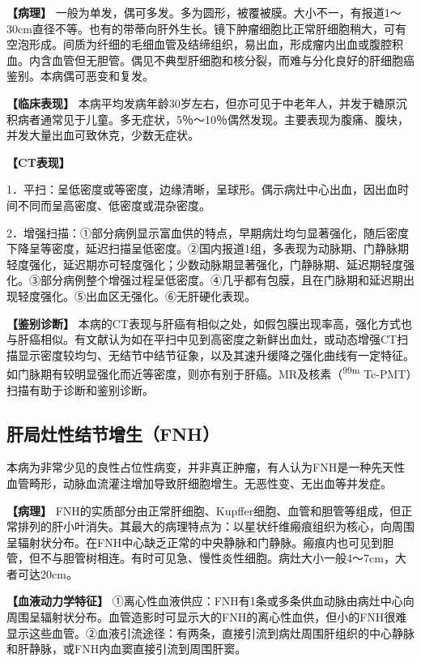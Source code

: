 \textbf{【病理】}
一般为单发，偶可多发。多为圆形，被覆被膜。大小不一，有报道1～30cm直径不等。也有的带蒂向肝外生长。镜下肿瘤细胞比正常肝细胞稍大，可有空泡形成。间质为纤细的毛细血管及结缔组织，易出血，形成瘤内出血或腹腔积血。内含血管但无胆管。偶见不典型肝细胞和核分裂，而难与分化良好的肝细胞癌鉴别。本病偶可恶变和复发。

\textbf{【临床表现】}
本病平均发病年龄30岁左右，但亦可见于中老年人，并发于糖原沉积病者通常见于儿童。多无症状，5％～10％偶然发现。主要表现为腹痛、腹块，并发大量出血可致休克，少数无症状。

\textbf{【CT表现】}

1．平扫：呈低密度或等密度，边缘清晰，呈球形。偶示病灶中心出血，因出血时间不同而呈高密度、低密度或混杂密度。

2．增强扫描：①部分病例显示富血供的特点，早期病灶均匀显著强化，随后密度下降呈等密度，延迟扫描呈低密度。②国内报道1组，多表现为动脉期、门静脉期轻度强化，延迟期亦可轻度强化；少数动脉期显著强化，门静脉期、延迟期轻度强化。③部分病例整个增强过程呈低密度。④几乎都有包膜，且在门脉期和延迟期出现轻度强化。⑤出血区无强化。⑥无肝硬化表现。

\textbf{【鉴别诊断】}
本病的CT表现与肝癌有相似之处，如假包膜出现率高，强化方式也与肝癌相似。有文献认为如在平扫中见到高密度之新鲜出血灶，或动态增强CT扫描显示密度较均匀、无结节中结节征象，以及其速升缓降之强化曲线有一定特征。如门脉期有较明显强化而近等密度，则亦有别于肝癌。MR及核素（\textsuperscript{99m}
Tc-PMT）扫描有助于诊断和鉴别诊断。

\subsection{肝局灶性结节增生（FNH）}

本病为非常少见的良性占位性病变，并非真正肿瘤，有人认为FNH是一种先天性血管畸形，动脉血流灌注增加导致肝细胞增生。无恶性变、无出血等并发症。

\textbf{【病理】}
FNH的实质部分由正常肝细胞、Kupffer细胞、血管和胆管等组成，但正常排列的肝小叶消失。其最大的病理特点为：以星状纤维瘢痕组织为核心，向周围呈辐射状分布。在FNH中心缺乏正常的中央静脉和门静脉。瘢痕内也可见到胆管，但不与胆管树相连。有时可见急、慢性炎性细胞。病灶大小一般4～7cm，大者可达20cm。

\textbf{【血液动力学特征】}
①离心性血液供应：FNH有1条或多条供血动脉由病灶中心向周围呈辐射状分布。血管造影时可显示大的FNH的离心性血供，但小的FNH很难显示这些血管。②血液引流途径：有两条，直接引流到病灶周围肝组织的中心静脉和肝静脉，或FNH内血窦直接引流到周围肝窦。

